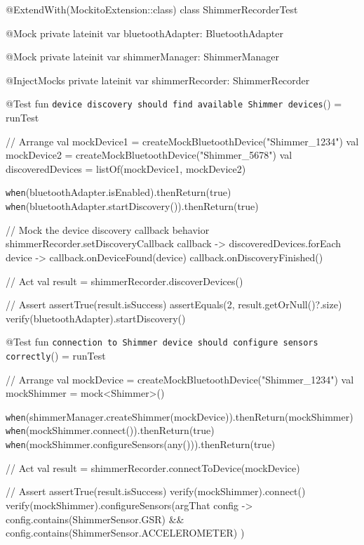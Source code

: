 \documentclass[11pt,a4paper]{report}
\begin{document}
    @ExtendWith(MockitoExtension::class)
    class ShimmerRecorderTest {

        @Mock
        private lateinit var bluetoothAdapter: BluetoothAdapter

        @Mock
        private lateinit var shimmerManager: ShimmerManager

        @InjectMocks
        private lateinit var shimmerRecorder: ShimmerRecorder

        @Test
        fun \texttt{device discovery should find available Shimmer devices}() = runTest {
            // Arrange
            val mockDevice1 = createMockBluetoothDevice("Shimmer\_1234")
            val mockDevice2 = createMockBluetoothDevice("Shimmer\_5678")
            val discoveredDevices = listOf(mockDevice1, mockDevice2)

            \texttt{when}(bluetoothAdapter.isEnabled).thenReturn(true)
            \texttt{when}(bluetoothAdapter.startDiscovery()).thenReturn(true)

            // Mock the device discovery callback behavior
            shimmerRecorder.setDiscoveryCallback { callback ->
                discoveredDevices.forEach { device ->
                    callback.onDeviceFound(device)
                }
                callback.onDiscoveryFinished()
            }

            // Act
            val result = shimmerRecorder.discoverDevices()

            // Assert
            assertTrue(result.isSuccess)
            assertEquals(2, result.getOrNull()?.size)
            verify(bluetoothAdapter).startDiscovery()
        }

        @Test
        fun \texttt{connection to Shimmer device should configure sensors correctly}() = runTest {
            // Arrange
            val mockDevice = createMockBluetoothDevice("Shimmer\_1234")
            val mockShimmer = mock<Shimmer>()

            \texttt{when}(shimmerManager.createShimmer(mockDevice)).thenReturn(mockShimmer)
            \texttt{when}(mockShimmer.connect()).thenReturn(true)
            \texttt{when}(mockShimmer.configureSensors(any())).thenReturn(true)

            // Act
            val result = shimmerRecorder.connectToDevice(mockDevice)

            // Assert
            assertTrue(result.isSuccess)
            verify(mockShimmer).connect()
            verify(mockShimmer).configureSensors(argThat { config ->
                config.contains(ShimmerSensor.GSR) && 
                config.contains(ShimmerSensor.ACCELEROMETER)
            })
        }
    }
\end{document}
